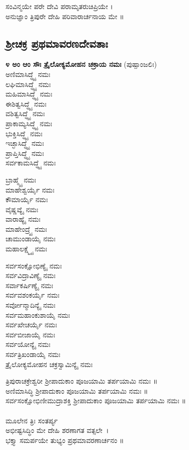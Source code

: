 ಸಂವಿನ್ಮಯೇ ಪರೇ ದೇವಿ ಪರಾಮೃತರುಚಿಪ್ರಿಯೇ ।\\
 ಅನುಜ್ಞಾಂ ತ್ರಿಪುರೇ ದೇಹಿ ಪರಿವಾರಾರ್ಚನಾಯ ಮೇ ॥
 

\subsection{ಶ್ರೀಚಕ್ರ ಪ್ರಥಮಾವರಣದೇವತಾಃ}
{\bfseries ೪ ಅಂ ಆಂ ಸೌಃ ತ್ರೈಲೋಕ್ಯಮೋಹನ ಚಕ್ರಾಯ ನಮಃ }(ಪುಷ್ಪಾಂಜಲಿಃ)\\
 ಅಣಿಮಾಸಿದ್ಧ್ಯೈ ನಮಃ\\
 ಲಘಿಮಾಸಿದ್ಧ್ಯೈ ನಮಃ\\
 ಮಹಿಮಾಸಿದ್ಧ್ಯೈ ನಮಃ\\
 ಈಶಿತ್ವಸಿದ್ಧ್ಯೈ ನಮಃ\\
 ವಶಿತ್ವಸಿದ್ಧ್ಯೈ ನಮಃ\\
 ಪ್ರಾಕಾಮ್ಯಸಿದ್ಧ್ಯೈ ನಮಃ\\
 ಭುಕ್ತಿಸಿದ್ಧ್ಯೈ ನಮಃ\\
 ಇಚ್ಛಾಸಿದ್ಧ್ಯೈ ನಮಃ\\
 ಪ್ರಾಪ್ತಿಸಿದ್ಧ್ಯೈ ನಮಃ\\
 ಸರ್ವಕಾಮಸಿದ್ಧ್ಯೈ ನಮಃ

 ಬ್ರಾಹ್ಮ್ಯೈ ನಮಃ\\
 ಮಾಹೇಶ್ವರ್ಯೈ ನಮಃ\\
 ಕೌಮಾರ್ಯೈ ನಮಃ\\
 ವೈಷ್ಣವ್ಯೈ ನಮಃ\\
 ವಾರಾಹ್ಯೈ ನಮಃ\\
 ಮಾಹೇಂದ್ರ್ಯೈ ನಮಃ\\
 ಚಾಮುಂಡಾಯೈ ನಮಃ\\
 ಮಹಾಲಕ್ಷ್ಮ್ಯೈ ನಮಃ

 ಸರ್ವಸಂಕ್ಷೋಭಿಣ್ಯೈ ನಮಃ\\
 ಸರ್ವವಿದ್ರಾವಿಣ್ಯೈ ನಮಃ\\
 ಸರ್ವಾಕರ್ಷಿಣ್ಯೈ ನಮಃ\\
 ಸರ್ವವಶಂಕರ್ಯೈ ನಮಃ\\
 ಸರ್ವೋನ್ಮಾದಿನ್ಯೈ ನಮಃ\\
 ಸರ್ವಮಹಾಂಕುಶಾಯೈ ನಮಃ\\
 ಸರ್ವಖೇಚರ್ಯೈ ನಮಃ\\
 ಸರ್ವಬೀಜಾಯೈ ನಮಃ\\
 ಸರ್ವಯೋನ್ಯೈ ನಮಃ\\
 ಸರ್ವತ್ರಿಖಂಡಾಯೈ ನಮಃ\\
 ತ್ರೈಲೋಕ್ಯಮೋಹನ ಚಕ್ರಸ್ವಾಮಿನ್ಯೈ ನಮಃ

 ತ್ರಿಪುರಾಚಕ್ರೇಶ್ವರೀ ಶ್ರೀಪಾದುಕಾಂ ಪೂಜಯಾಮಿ ತರ್ಪಯಾಮಿ ನಮಃ ॥\\
 ಅಣಿಮಾಸಿದ್ಧಿ ಶ್ರೀಪಾದುಕಾಂ ಪೂಜಯಾಮಿ ತರ್ಪಯಾಮಿ ನಮಃ ॥\\
 ಸರ್ವಸಂಕ್ಷೋಭಿಣೀಮುದ್ರಾಶಕ್ತಿ ಶ್ರೀಪಾದುಕಾಂ ಪೂಜಯಾಮಿ ತರ್ಪಯಾಮಿ ನಮಃ ॥\\
\\
ಮೂಲೇನ ತ್ರಿಃ ಸಂತರ್ಪ್ಯ\\
 ಅಭೀಷ್ಟಸಿದ್ಧಿಂ ಮೇ ದೇಹಿ ಶರಣಾಗತ ವತ್ಸಲೇ~।\\
ಭಕ್ತ್ಯಾ ಸಮರ್ಪಯೇ ತುಭ್ಯಂ ಪ್ರಥಮಾವರಣಾರ್ಚನಂ ॥
